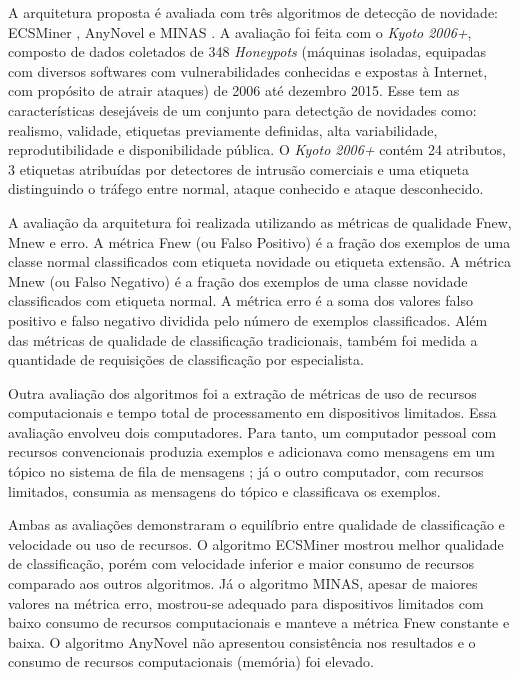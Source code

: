 A arquitetura proposta é avaliada com três algoritmos de detecção de novidade:
ECSMiner \cite{Masud2010ECSMiner}, AnyNovel \cite{Abdallah2016anynovel} e MINAS
\cite{Faria2016minas}.
A avaliação foi feita com o \dataset \emph{Kyoto 2006+}, composto de
dados coletados de 348 \emph{Honeypots} 
(máquinas isoladas, equipadas com diversos
softwares com vulnerabilidades conhecidas e expostas à Internet, com propósito de
atrair ataques) de 2006 até dezembro 2015.
Esse \dataset tem as características desejáveis de um conjunto para detectção de
novidades como: realismo, validade, etiquetas previamente definidas, alta
variabilidade, reprodutibilidade e disponibilidade pública.
O \dataset \emph{Kyoto 2006+} contém 24 atributos, 3 etiquetas atribuídas por
detectores de intrusão comerciais e uma etiqueta
distinguindo o tráfego entre normal, ataque conhecido e ataque desconhecido.

A avaliação da arquitetura foi realizada utilizando as métricas de qualidade
Fnew, Mnew e erro.
A métrica Fnew (ou Falso Positivo) é a fração dos exemplos de uma classe normal
classificados com etiqueta novidade ou etiqueta extensão.
A métrica Mnew (ou Falso Negativo) é a fração dos exemplos de uma classe novidade
classificados com etiqueta normal.
A métrica erro é a soma dos valores falso positivo e falso negativo dividida
pelo número de exemplos classificados.
Além das métricas de qualidade de classificação tradicionais, também foi medida
a quantidade de requisições de classificação por especialista.

Outra avaliação dos algoritmos foi a extração de métricas de uso de recursos
computacionais e tempo total de processamento em dispositivos limitados.
Essa avaliação envolveu dois computadores.
Para tanto, um computador pessoal com recursos
convencionais produzia exemplos e adicionava como mensagens em um tópico no
sistema de fila de mensagens \kafka; já o outro computador, com recursos
limitados, consumia as mensagens do tópico e classificava os exemplos.

Ambas as avaliações demonstraram o equilíbrio entre qualidade de classificação e
velocidade ou uso de recursos.
O algoritmo ECSMiner mostrou melhor qualidade de classificação, porém com
velocidade inferior e maior consumo de recursos comparado aos outros algoritmos.
Já o algoritmo MINAS, apesar de maiores valores na métrica erro, mostrou-se
adequado para dispositivos limitados com baixo consumo de recursos
computacionais e manteve a métrica Fnew constante e baixa.
O algoritmo AnyNovel não apresentou consistência nos resultados e o consumo
de recursos computacionais (memória) foi elevado.

